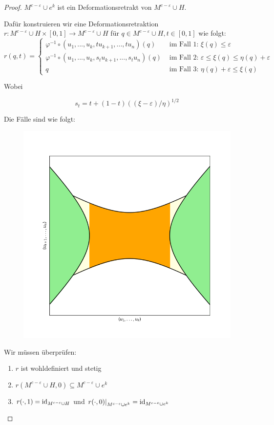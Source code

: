 \documentclass[a4paper,11pt]{article}
\begin{document}
\begin{proof}
     $M^{c - \varepsilon} \cup e^{k}$ ist ein 
    Deformationsretrakt von $M^{c - \varepsilon} \cup H$.

    Dafür konstruieren wir eine Deformationsretraktion
    $r: M^{c - \varepsilon} \cup H \times [0,1] \to M^{c - \varepsilon} \cup H$
    für $q \in M^{c - \varepsilon} \cup H, t \in [0, 1]$ wie folgt:
    \[
        r(q, t) = \begin{cases}
            \varphi^{-1} \circ (u_1, ..., u_k, tu_{k + 1}, ..., tu_n)(q)
                & \text{ im Fall 1: } \xi(q) \leq \varepsilon \\
            \varphi^{-1} \circ (u_1, ..., u_k, s_tu_{k + 1}, ..., s_tu_n)(q)
                & \text{ im Fall 2: } \varepsilon \leq \xi(q) \leq \eta(q) + \varepsilon \\
            q & \text{ im Fall 3: } \eta(q) + \varepsilon \leq \xi(q)
        \end{cases}
    \]

    Wobei 

    \[ s_t = t + (1 -t)((\xi - \varepsilon)/\eta)^{1/2} \]

    Die Fälle sind wie folgt:

    \begin{figure}[H]
        \centering
        \includegraphics[width=0.8\linewidth]{resources/Me-Diagram9-handle-cases.png}
        \label{me-diagram9}
    \end{figure}

    Wir müssen überprüfen:
    \begin{enumerate}
        \item $r$ ist wohldefiniert und stetig
        \item $r(M^{c - \varepsilon} \cup H, 0) \subseteq M^{c - \varepsilon} \cup e^k$
        \item $r(\cdot, 1) = { \operatorname{id} }_{M^{c - \varepsilon} \cup H}$ und 
            $\left. r(\cdot , 0) \right\vert_{M^{c - \varepsilon} \cup e^k} 
            = { \operatorname{id} }_{M^{c - \varepsilon} \cup e^k}$
    \end{enumerate}


\end{proof}
\end{document}
